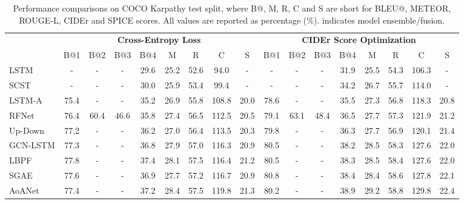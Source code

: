 \documentclass[10pt,twocolumn,letterpaper]{article}
\begin{document}
\begin{table*}[t]\scriptsize
    \centering
    \vspace{-0.1in}
\caption{\small Performance comparisons on COCO Karpathy test split, where B@, M, R, C and S are short for BLEU@, METEOR, ROUGE-L, CIDEr and SPICE scores. All values are reported as percentage (\%).  indicates model ensemble/fusion.}
    \vspace{-0.0in}
    \begin{tabular}{l | c c c c c c c c | c c c c c c c c}
        \Xhline{2\arrayrulewidth}
		  & \multicolumn{8}{c|}{\textbf{Cross-Entropy Loss}} & \multicolumn{8}{c}{\textbf{CIDEr Score Optimization}} \\
		                             & B@1  & B@2  & B@3  & B@4  & M    & R    & C     & S    & B@1  & B@2  & B@3  & B@4  & M    & R    & C     & S  \\	
			\hline \hline
LSTM \cite{Vinyals14}            &   -  &   -  &   -  & 29.6 & 25.2 & 52.6 & 94.0  &  -   &  -   &  -   &  -   & 31.9 & 25.5 & 54.3 & 106.3 &  -   \\
SCST \cite{rennie2017self}       &   -  &   -  &   -  & 30.0 & 25.9 & 53.4 & 99.4  &  -   &  -   &  -   &  -   & 34.2 & 26.7 & 55.7 & 114.0 &  -   \\
LSTM-A \cite{yao2017boosting}    & 75.4 &   -  &   -  & 35.2 & 26.9 & 55.8 & 108.8 & 20.0 & 78.6 &  -   &  -   & 35.5 & 27.3 & 56.8 & 118.3 & 20.8 \\
RFNet \cite{jiang2018recurrent}  & 76.4 & 60.4 & 46.6 & 35.8 & 27.4 & 56.5 & 112.5 & 20.5 & 79.1 & 63.1 & 48.4 & 36.5 & 27.7 & 57.3 & 121.9 & 21.2 \\
Up-Down \cite{anderson2017bottom}& 77.2 &   -  &   -  & 36.2 & 27.0 & 56.4 & 113.5 & 20.3 & 79.8 &  -   &  -   & 36.3 & 27.7 & 56.9 & 120.1 & 21.4 \\
GCN-LSTM \cite{yao2018exploring} & 77.3 &   -  &   -  & 36.8 & 27.9 & 57.0 & 116.3 & 20.9 & 80.5 &  -   &  -   & 38.2 & 28.5 & 58.3 & 127.6 & 22.0 \\
LBPF \cite{qin2019look}           & 77.8 &   -  &   -  & 37.4 & 28.1 & 57.5 & 116.4 & 21.2 & 80.5 &  -   &  -   & 38.3 & 28.5 & 58.4 & 127.6 & 22.0 \\
SGAE \cite{Yang:CVPR19}          & 77.6 &   -  &   -  & 36.9 & 27.7 & 57.2 & 116.7 & 20.9 & 80.8 &  -   &  -   & 38.4 & 28.4 & 58.6 & 127.8 & 22.1 \\
AoANet \cite{huang2019attentio}  & 77.4 &   -  &   -  & 37.2 & 28.4 & 57.5 & 119.8 & 21.3 & 80.2 &  -   &  -   & 38.9 & 29.2 & 58.8 & 129.8 & 22.4 \\

\end{tabular}
\end{table*}
\end{document}
